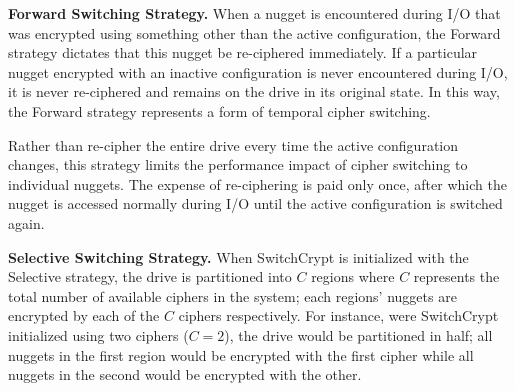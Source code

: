 \textbf{Forward Switching Strategy.} When a nugget is encountered during I/O
that was encrypted using something other than the active configuration, the
Forward strategy dictates that this nugget be re-ciphered immediately. If a
particular nugget encrypted with an inactive configuration is never encountered
during I/O, it is never re-ciphered and remains on the drive in its original
state. In this way, the Forward strategy represents a form of temporal cipher
switching.

Rather than re-cipher the entire drive every time the active configuration
changes, this strategy limits the performance impact of cipher switching to
individual nuggets. The expense of re-ciphering is paid only once, after which
the nugget is accessed normally during I/O until the active configuration is
switched again.


\textbf{Selective Switching Strategy.} When SwitchCrypt is initialized with the
Selective strategy, the drive is partitioned into $C$ regions where $C$
represents the total number of available ciphers in the system; each regions'
nuggets are encrypted by each of the $C$ ciphers respectively. For instance,
were SwitchCrypt initialized using two ciphers ($C = 2$), the drive would be
partitioned in half; all nuggets in the first region would be encrypted with the
first cipher while all nuggets in the second would be encrypted with the other.


